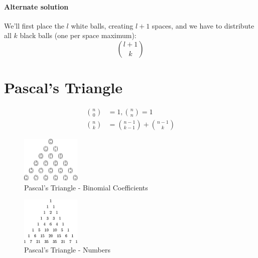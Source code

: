 \documentclass[00_complete]{subfiles}
\begin{document}
\paragraph{Alternate solution}

We'll first place the $l$ white balls, creating $l+1$ spaces, and we have to
distribute all $k$ black balls (one per space maximum):
$$\binom{l+1}{k}$$

\section{Pascal's Triangle}

\begin{reminder}
    \begin{align*}
        \binom{n}{0} &= 1, \binom{n}{n} = 1 \\
        \binom{n}{k} &= \binom{n-1}{k-1} + \binom{n-1}{k}
    \end{align*}
\end{reminder}

\begin{figure}[ht]
  \centering
    \includegraphics[width=0.25\textwidth]{pascals-binom}
    \caption{Pascal's Triangle - Binomial Coefficients}
\end{figure}
\begin{figure}[ht]
  \centering
    \includegraphics[width=0.25\textwidth]{pascals-trig}
    \caption{Pascal's Triangle - Numbers}
\end{figure}
\end{document}
